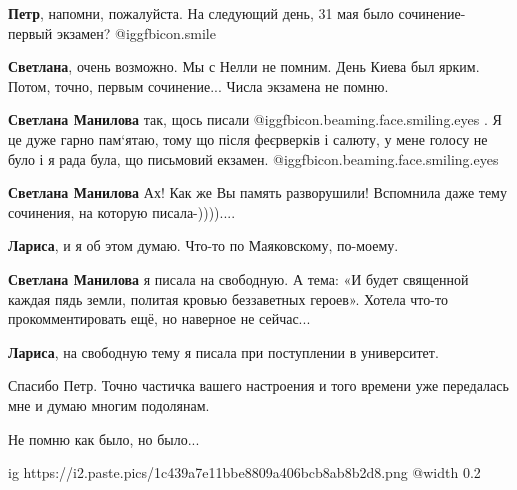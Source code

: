  
 
 
 
 
\zzSecCmt

\begin{itemize} %
\textbf{Петр}, напомни, пожалуйста. На следующий день, 31 мая было сочинение- первый экзамен? @igg{fbicon.smile} 

\begin{itemize} %
\textbf{Светлана}, очень возможно. Мы с Нелли не помним. День Киева был ярким. Потом, точно, первым сочинение... Числа экзамена не помню.

\textbf{Светлана Манилова} так, щось писали @igg{fbicon.beaming.face.smiling.eyes} . Я це дуже гарно пам‘ятаю, тому що після феєрверків і салюту, у мене голосу не було і я рада була, що письмовий екзамен.  @igg{fbicon.beaming.face.smiling.eyes} 

\textbf{Светлана Манилова} Ах! Как же Вы память разворушили! Вспомнила даже тему сочинения, на которую писала-))))....

\begin{itemize} %
\textbf{Лариса}, и я об этом думаю. Что-то по Маяковскому, по-моему.

\textbf{Светлана Манилова} я писала на свободную. А тема: «И будет священной каждая пядь земли, политая кровью беззаветных героев». Хотела что-то прокомментировать ещё, но наверное не сейчас...

\textbf{Лариса}, на свободную тему я писала при поступлении в университет.
\end{itemize} %

\end{itemize} %

Спасибо Петр. Точно частичка вашего настроения и того времени уже передалась мне и думаю многим подолянам.

Не помню как было, но было...

\ifcmt
  ig https://i2.paste.pics/1c439a7e11bbe8809a406bcb8ab8b2d8.png
  @width 0.2
\fi


\end{itemize}
